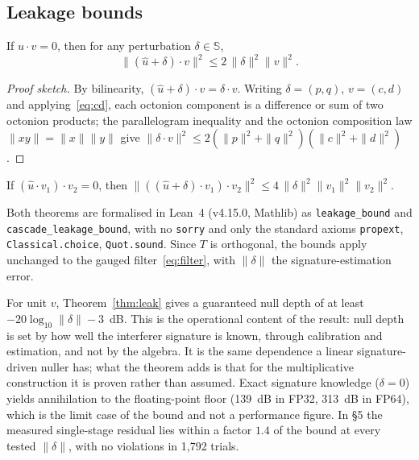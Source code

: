 \subsection{Leakage bounds}\label{sec:bound}
\begin{theorem}\label{thm:leak}
If $\hat u\cdot v=0$, then for any perturbation $\delta\in\mathbb{S}$,
\begin{equation}
\|(\hat u+\delta)\cdot v\|^2\le 2\,\|\delta\|^2\|v\|^2 .
\end{equation}
\end{theorem}
\begin{proof}[Proof sketch]
By bilinearity, $(\hat u+\delta)\cdot v=\delta\cdot v$. Writing $\delta=(p,q)$, $v=(c,d)$ and
applying~\eqref{eq:cd}, each octonion component is a difference or sum of two octonion
products; the parallelogram inequality and the octonion composition law
$\|xy\|=\|x\|\|y\|$ give $\|\delta\cdot v\|^2\le 2(\|p\|^2+\|q\|^2)(\|c\|^2+\|d\|^2)$.
\end{proof}

\begin{theorem}\label{thm:cascade}
If $(\hat u\cdot v_1)\cdot v_2=0$, then
$\|((\hat u+\delta)\cdot v_1)\cdot v_2\|^2\le 4\,\|\delta\|^2\|v_1\|^2\|v_2\|^2$.
\end{theorem}

Both theorems are formalised in Lean~4 (v4.15.0, Mathlib) as \texttt{leakage\_bound} and
\texttt{cascade\_leakage\_bound}, with no \texttt{sorry} and only the standard axioms
\texttt{propext}, \texttt{Classical.choice}, \texttt{Quot.sound}. Since $T$ is orthogonal, the
bounds apply unchanged to the gauged filter~\eqref{eq:filter}, with $\|\delta\|$ the
signature-estimation error.

For unit $v$, Theorem~\ref{thm:leak} gives a guaranteed null depth of at least
$-20\log_{10}\|\delta\|-3$~dB. This is the operational content of the result: null depth is
set by how well the interferer signature is known, through calibration and estimation, and not
by the algebra. It is the same dependence a linear signature-driven nuller has; what the
theorem adds is that for the multiplicative construction it is proven rather than assumed.
Exact signature knowledge ($\delta=0$) yields annihilation to the floating-point floor
(139~dB in FP32, 313~dB in FP64), which is the limit case of the bound and not a performance
figure. In \S5 the measured single-stage residual lies within a factor $1.4$ of the bound at
every tested $\|\delta\|$, with no violations in 1{,}792 trials.
